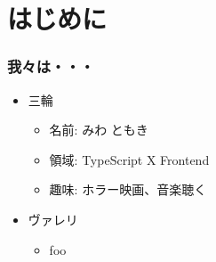 \section{はじめに}
\begin{frame}
    \frametitle{我々は・・・}
    \begin{itemize}
        \item<4-> 三輪
        \begin{itemize}
            \item<5-> 名前: みわ ともき
            \item<6-> 領域: TypeScript X Frontend
            \item<7-> 趣味: ホラー映画、音楽聴く
        \end{itemize}
        \item<8-> ヴァレリ
        \begin{itemize}
            \item<9-> foo
        \end{itemize}
    \end{itemize}
\end{frame}